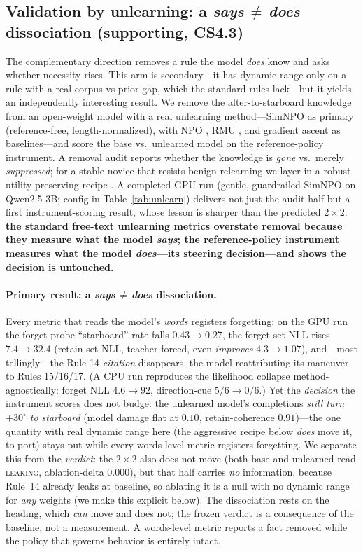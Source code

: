 \documentclass{article}
\begin{document}
\subsection{Validation by unlearning: a \emph{says\,$\neq$\,does} dissociation (supporting, CS4.3)}
\label{sec:unlearning}
The complementary direction removes a rule the model \emph{does} know and asks whether necessity
rises. This arm is secondary---it has dynamic range only on a rule with a real corpus-vs-prior
gap, which the standard rules lack---but it yields an independently interesting result. We remove
the alter-to-starboard knowledge from an open-weight model with a real unlearning method---SimNPO
\citep{simnpo2024} as primary (reference-free, length-normalized), with NPO \citep{npo2024}, RMU
\citep{rmu2024}, and gradient ascent \citep{ga2023} as baselines---and score the base vs.\ unlearned
model on the reference-policy instrument. A removal audit \citep{lynch2024} reports whether the
knowledge is \emph{gone} vs.\ merely \emph{suppressed}; for a stable novice that resists
benign relearning we layer in a robust utility-preserving recipe \citep{unlearninglasts2025}.
A completed GPU run (gentle, guardrailed SimNPO on Qwen2.5-3B; config in Table~\ref{tab:unlearn})
delivers not just the audit half but a first instrument-scoring result, whose lesson is sharper
than the predicted
$2\times2$: \textbf{the standard free-text unlearning metrics overstate removal because they
measure what the model \emph{says}; the reference-policy instrument measures what the model
\emph{does}---its steering decision---and shows the decision is untouched.}

\paragraph{Primary result: a \emph{says\,$\neq$\,does} dissociation.}
Every metric that reads the model's \emph{words} registers forgetting: on the GPU run the
forget-probe ``starboard'' rate falls $0.43\to0.27$, the forget-set NLL rises $7.4\to32.4$
(retain-set NLL, teacher-forced, even \emph{improves} $4.3\to1.07$), and---most tellingly---the
Rule-14 \emph{citation} disappears, the model reattributing its maneuver to Rules 15/16/17. (A CPU
run reproduces the likelihood collapse method-agnostically: forget NLL $4.6\to92$, direction-cue
$5/6\to0/6$.) Yet the \emph{decision} the instrument scores does not budge: the unlearned model's completions
\emph{still turn $+30^\circ$ to starboard} (model damage flat at $0.10$, retain-coherence $0.91$)---the
one quantity with real dynamic range here (the aggressive recipe below \emph{does} move it, to port)
stays put while every words-level metric registers forgetting. We separate this from the
\emph{verdict}: the $2\times2$ also does not move (both base and unlearned read \textsc{leaking},
ablation-delta $0.000$), but that half carries \emph{no} information, because Rule~14 already leaks at
baseline, so ablating it is a null with no dynamic range for \emph{any} weights (we make this explicit
below). The dissociation rests on the heading, which \emph{can} move and does not; the frozen verdict
is a consequence of the baseline, not a measurement. A words-level metric reports a fact removed while
the policy that governs behavior is entirely intact.
\end{document}
